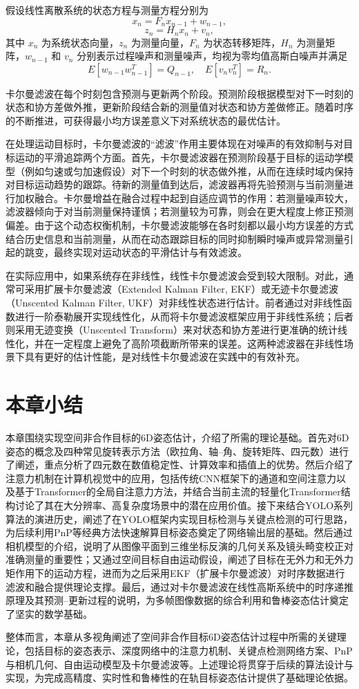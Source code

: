 假设线性离散系统的状态方程与测量方程分别为
\begin{equation}
	x_n = F_n x_{n-1} + w_{n-1},
\end{equation}
\begin{equation}
	z_n = H_n x_n + v_n,
\end{equation}
其中 \(x_n\) 为系统状态向量，\(z_n\) 为测量向量，\(F_n\) 为状态转移矩阵，\(H_n\) 为测量矩阵，\(w_{n-1}\) 和 \(v_n\) 分别表示过程噪声和测量噪声，均视为零均值高斯白噪声并满足
\begin{equation}
	E[w_{n-1} w_{n-1}^T] = Q_{n-1},
	\quad 
	E[v_n v_n^T] = R_n.
\end{equation}

卡尔曼滤波在每个时刻包含预测与更新两个阶段。预测阶段根据模型对下一时刻的状态和协方差做外推，更新阶段结合新的测量值对状态和协方差做修正。随着时序的不断推进，可获得最小均方误差意义下对系统状态的最优估计。

在处理运动目标时，卡尔曼滤波的“滤波”作用主要体现在对噪声的有效抑制与对目标运动的平滑追踪两个方面。首先，卡尔曼滤波器在预测阶段基于目标的运动学模型（例如匀速或匀加速假设）对下一个时刻的状态做外推，从而在连续时域内保持对目标运动趋势的跟踪。待新的测量值到达后，滤波器再将先验预测与当前测量进行加权融合。卡尔曼增益在融合过程中起到自适应调节的作用：若测量噪声较大，滤波器倾向于对当前测量保持谨慎；若测量较为可靠，则会在更大程度上修正预测偏差。由于这个动态权衡机制，卡尔曼滤波能够在各时刻都以最小均方误差的方式结合历史信息和当前测量，从而在动态跟踪目标的同时抑制瞬时噪声或异常测量引起的跳变，最终实现对运动状态的平滑估计与有效滤波。

在实际应用中，如果系统存在非线性，线性卡尔曼滤波会受到较大限制。对此，通常可采用扩展卡尔曼滤波（Extended Kalman Filter, EKF）或无迹卡尔曼滤波（Unscented Kalman Filter, UKF）对非线性状态进行估计。前者通过对非线性函数进行一阶泰勒展开实现线性化，从而将卡尔曼滤波框架应用于非线性系统；后者则采用无迹变换（Unscented Transform）来对状态和协方差进行更准确的统计线性化，并在一定程度上避免了高阶项截断所带来的误差。这两种滤波器在非线性场景下具有更好的估计性能，是对线性卡尔曼滤波在实践中的有效补充。




\section{本章小结}

本章围绕实现空间非合作目标的6D姿态估计，介绍了所需的理论基础。首先对6D姿态的概念及四种常见旋转表示方法（欧拉角、轴–角、旋转矩阵、四元数）进行了阐述，重点分析了四元数在数值稳定性、计算效率和插值上的优势。然后介绍了注意力机制在计算机视觉中的应用，包括传统CNN框架下的通道和空间注意力以及基于Transformer的全局自注意力方法，并结合当前主流的轻量化Transformer结构讨论了其在大分辨率、高复杂度场景中的潜在应用价值。接下来结合YOLO系列算法的演进历史，阐述了在YOLO框架内实现目标检测与关键点检测的可行思路，为后续利用PnP等经典方法快速解算目标姿态奠定了网络输出层的基础。然后通过相机模型的介绍，说明了从图像平面到三维坐标反演的几何关系及镜头畸变校正对准确测量的重要性；又通过空间目标自由运动假设，阐述了目标在无外力和无外力矩作用下的运动方程，进而为之后采用EKF（扩展卡尔曼滤波）对时序数据进行滤波和融合提供理论支撑。最后，通过对卡尔曼滤波在线性高斯系统中的时序递推原理及其预测–更新过程的说明，为多帧图像数据的综合利用和鲁棒姿态估计奠定了坚实的数学基础。

整体而言，本章从多视角阐述了空间非合作目标6D姿态估计过程中所需的关键理论，包括目标的姿态表示、深度网络中的注意力机制、关键点检测网络方案、PnP与相机几何、自由运动模型及卡尔曼滤波等。上述理论将贯穿于后续的算法设计与实现，为完成高精度、实时性和鲁棒性的在轨目标姿态估计提供了基础理论依据。